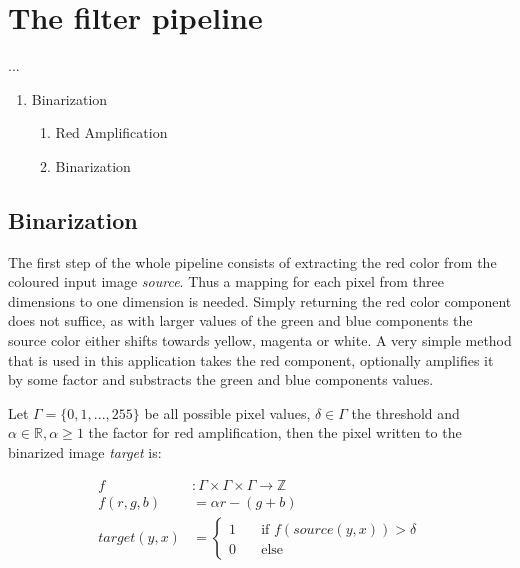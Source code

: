 \documentclass{report}
\begin{document}
\pagebreak
\chapter{The filter pipeline}
...

\begin{enumerate}
\item Binarization

  \begin{enumerate}
  \item Red Amplification
  \item Binarization
  \end{enumerate}

\end{enumerate}


\section{Binarization}

The first step of the whole pipeline consists of extracting the red
color from the coloured input image \textit{source}. Thus a mapping
for each pixel from three dimensions to one dimension is
needed. Simply returning the red color component does not suffice, as
with larger values of the green and blue components the source color
either shifts towards yellow, magenta or white. A very simple method
that is used in this application takes the red component, optionally
amplifies it by some factor and substracts the green and blue
components values.

Let \( \Gamma = \{0, 1, ..., 255\} \) be all possible pixel values, \(
\delta \in \Gamma \) the threshold and \( \alpha \in \mathbb{R},
\alpha \geq 1 \) the factor for red amplification, then the pixel
written to the binarized image \textit{target} is:

\begin{equation}\label{eq:binarization}
  \begin{split}
    f & : \Gamma \times \Gamma \times \Gamma \to \mathbb{Z} \\
    f(r, g, b) & = \alpha r - (g + b) \\
    target(y, x) & =
    \begin{cases}
      1 & \quad \text{if } f(source(y, x)) > \delta \\
      0 & \quad \text{else}
    \end{cases}
  \end{split}
\end{equation}
\end{document}
